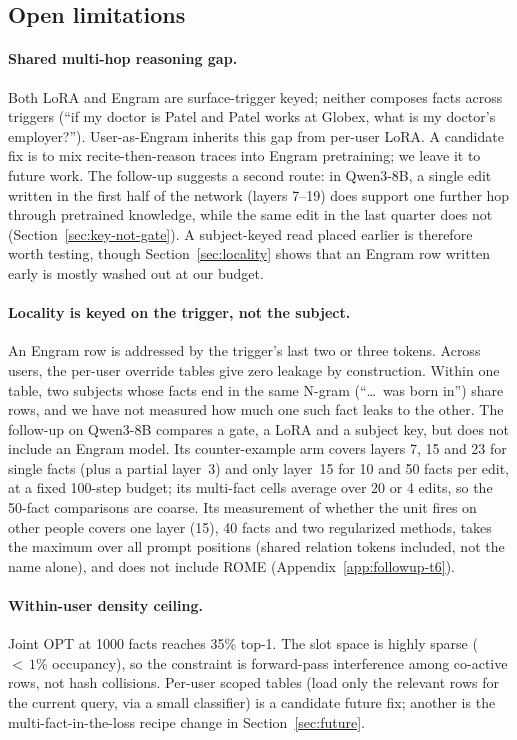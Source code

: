 \documentclass[11pt]{article}
\begin{document}
\subsection{Open limitations}
\label{sec:limitations}

\paragraph{Shared multi-hop reasoning gap.}
Both LoRA and Engram are surface-trigger keyed; neither
composes facts across triggers (``if my doctor is Patel and
Patel works at Globex, what is my doctor's employer?'').
User-as-Engram inherits this gap from per-user LoRA. A candidate
fix is to mix recite-then-reason traces into Engram pretraining;
we leave it to future work. The follow-up suggests a second route:
in Qwen3-8B, a single edit written in the first half of the network
(layers 7--19) does support one further hop through pretrained
knowledge, while the same edit in the last quarter does not
(Section~\ref{sec:key-not-gate}). A subject-keyed read placed earlier
is therefore worth testing, though Section~\ref{sec:locality} shows that
an Engram row written early is mostly washed out at our budget.

\paragraph{Locality is keyed on the trigger, not the subject.}
An Engram row is addressed by the trigger's last two or three tokens.
Across users, the per-user override tables give zero leakage by
construction. Within one table, two subjects whose facts end in the
same N-gram (``\ldots\ was born in'') share rows, and we have not
measured how much one such fact leaks to the other. The follow-up on
Qwen3-8B compares a gate, a LoRA and a subject key, but does not
include an Engram model. Its counter-example arm covers layers 7, 15
and 23 for single facts (plus a partial layer~3) and only layer~15 for
10 and 50 facts per edit, at a fixed 100-step budget; its multi-fact
cells average over 20 or 4 edits, so the 50-fact comparisons are
coarse. Its measurement of whether the unit fires on other
people covers one layer (15), 40 facts and two regularized methods,
takes the maximum over all prompt positions (shared relation tokens
included, not the name alone), and does not include ROME
(Appendix~\ref{app:followup-t6}).

\paragraph{Within-user density ceiling.}
Joint OPT at 1000 facts reaches 35\% top-1. The slot space is
highly sparse (${<}\,1\%$ occupancy), so the constraint is
forward-pass interference among co-active rows, not hash
collisions. Per-user scoped tables (load only the relevant rows
for the current query, via a small classifier) is a candidate
future fix; another is the multi-fact-in-the-loss recipe change
in Section~\ref{sec:future}.
\end{document}
